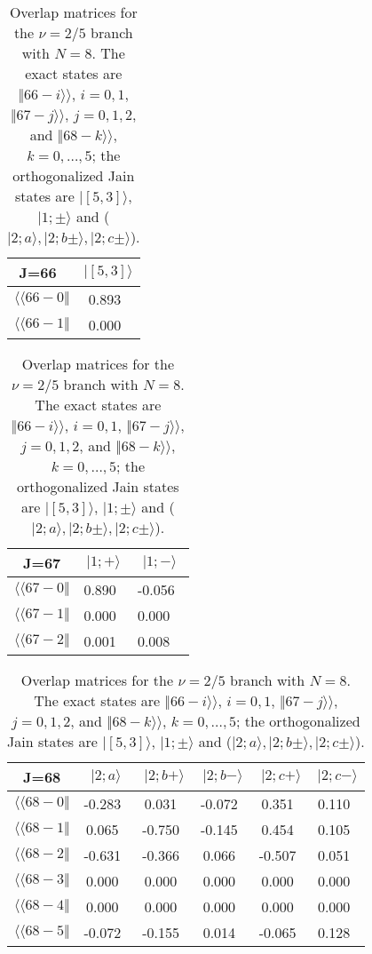 \begin{table}
\caption{Overlap matrices for the $\nu=2/5$ branch with $N=8$.
The exact states are $\Vert 66-i \rangle\rangle$, $i=0,1$, 
$\Vert 67-j \rangle\rangle$, $j=0,1,2$, and 
$\Vert 68-k \rangle\rangle$, $k=0,\dots,5$;
the orthogonalized Jain states are
$\vert [5,3] \rangle$, $\vert 1;\pm\rangle$ and
($\vert 2;a\rangle,\vert2;b\pm\rangle,\vert 2;c\pm\rangle$).} 
\label{tab3}
\vspace{0.4cm}
\begin{center}
\begin{tabular}{|c|c|} 
\hline
J=66\  & $\vert [5,3] \rangle$  \\ 
\hline
$\langle\langle 66- 0\Vert$  & 0.893\ \\ 
$\langle\langle 66- 1\Vert$  & 0.000\ \\
\end{tabular}
\begin{tabular}{|c|c|c|} 
J=67    & $\vert 1; +\rangle$  & $\vert 1;-\rangle$  \\ 
\hline
$\langle\langle 67-0\Vert$ & 0.890\ & -0.056\  \\
$\langle\langle 67-1\Vert$ & 0.000\ & 0.000 \  \\
$\langle\langle 67-2\Vert$ & 0.001\ & 0.008 \ \\
\end{tabular}
\begin{tabular}{|c|c|c|c|c|c|} 
J=68 & $\vert 2;a\rangle$ & $\vert 2;b+\rangle$ & $\vert 2;b-\rangle$ &
$\vert 2;c+\rangle$ & $\vert 2;c-\rangle$ \\
\hline
$\langle\langle 68-0\Vert$ & -0.283\ & 0.031\  & -0.072\ & 0.351\ & 0.110\ \\
$\langle\langle 68-1\Vert$ &  0.065\ & -0.750\ & -0.145\ & 0.454\ & 0.105\ \\
$\langle\langle 68-2\Vert$ & -0.631\ & -0.366\ & 0.066\  & -0.507\ & 0.051\ \\
$\langle\langle 68-3\Vert$ & 0.000\  & 0.000\  & 0.000\  & 0.000\ & 0.000\ \\
$\langle\langle 68-4\Vert$ & 0.000\  & 0.000\  & 0.000\  & 0.000\ & 0.000\ \\
$\langle\langle 68-5\Vert$ & -0.072\ & -0.155\ & 0.014\  & -0.065\ & 0.128\ \\
\hline
\end{tabular}
\end{center}
\end{table}

